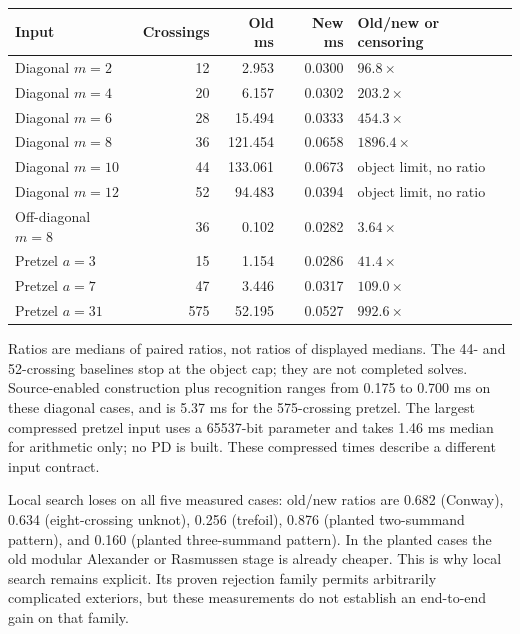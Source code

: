 \begin{center}\small
\begin{tabular}{lrrrl}
\toprule
Input & Crossings & Old ms & New ms & Old/new or censoring\\
\midrule
Diagonal $m=2$ &12&2.953&0.0300&$96.8\times$\\
Diagonal $m=4$ &20&6.157&0.0302&$203.2\times$\\
Diagonal $m=6$ &28&15.494&0.0333&$454.3\times$\\
Diagonal $m=8$ &36&121.454&0.0658&$1896.4\times$\\
Diagonal $m=10$ &44&133.061&0.0673&object limit, no ratio\\
Diagonal $m=12$ &52&94.483&0.0394&object limit, no ratio\\
Off-diagonal $m=8$ &36&0.102&0.0282&$3.64\times$\\
Pretzel $a=3$ &15&1.154&0.0286&$41.4\times$\\
Pretzel $a=7$ &47&3.446&0.0317&$109.0\times$\\
Pretzel $a=31$ &575&52.195&0.0527&$992.6\times$\\
\bottomrule
\end{tabular}
\end{center}
Ratios are medians of paired ratios, not ratios of displayed medians.
The 44- and 52-crossing baselines stop at the object cap; they are not
completed solves.  Source-enabled construction plus recognition ranges from
0.175 to 0.700 ms on these diagonal cases, and is 5.37 ms for the
575-crossing pretzel.  The largest compressed pretzel input uses a
65537-bit parameter and takes 1.46 ms median for arithmetic only; no PD is
built.  These compressed times describe a different input contract.

Local search loses on all five measured cases: old/new ratios are
0.682 (Conway), 0.634 (eight-crossing unknot), 0.256 (trefoil), 0.876
(planted two-summand pattern), and 0.160 (planted three-summand pattern).
In the planted cases the old modular Alexander or Rasmussen stage is already
cheaper.  This is why local search remains explicit.  Its proven rejection
family permits arbitrarily complicated exteriors, but these measurements
do not establish an end-to-end gain on that family.
